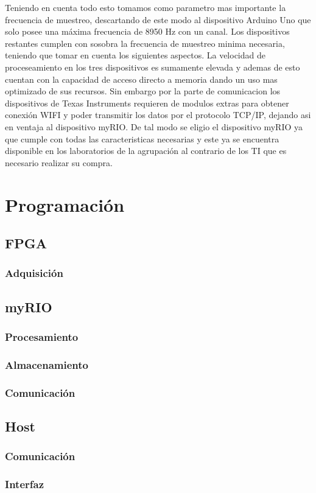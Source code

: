   \par Teniendo en cuenta todo esto tomamos como parametro mas importante la frecuencia de
  muestreo, descartando de este modo al dispositivo Arduino Uno que solo posee una
  máxima frecuencia de 8950 Hz con un canal. Los dispositivos restantes cumplen con
  sosobra la frecuencia de muestreo minima necesaria, teniendo que tomar en cuenta los
  siguientes aspectos. La velocidad de proceseamiento en los tres dispositivos es
  sumamente elevada y ademas de esto cuentan con la capacidad de acceso directo a
  memoria dando un uso mas optimizado de sus recursos. Sin embargo por la parte de
  comunicacion los dispositivos de Texas Instruments requieren de modulos extras
  para obtener conexión WIFI y poder transmitir los datos por el protocolo TCP/IP,
  dejando asi en ventaja al dispositivo myRIO. De tal modo se eligio el dispositivo
  myRIO ya que cumple con todas las caracteristicas necesarias y este ya se encuentra
  disponible en los laboratorios de la agrupación al contrario de los TI que es necesario
  realizar su compra.

\section{Programación}
  \subsection{FPGA}
    \subsubsection{Adquisición}
  \subsection{myRIO}
    \subsubsection{Procesamiento}
    \subsubsection{Almacenamiento}
    \subsubsection{Comunicación}
  \subsection{Host}
    \subsubsection{Comunicación}
    \subsubsection{Interfaz}
